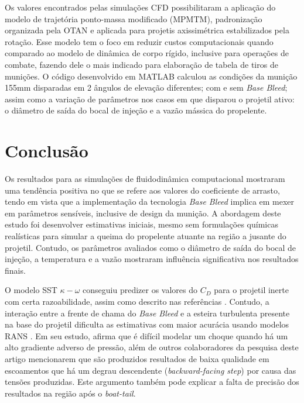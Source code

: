 Os valores encontrados pelas simulações CFD possibilitaram a aplicação do modelo de trajetória ponto-massa modificado (MPMTM), padronização organizada pela OTAN \cite{stanag4355} e aplicada para projetis axissimétrica estabilizados pela rotação. Esse modelo tem o foco em reduzir custos computacionais quando comparado ao modelo de dinâmica de corpo rígido, inclusive para operações de combate, fazendo dele o mais indicado para elaboração de tabela de tiros de munições. O código desenvolvido em MATLAB\textregistered{} calculou as condições da munição 155mm disparadas em 2 ângulos de elevação diferentes; com e sem \textit{Base Bleed}; assim como a variação de parâmetros nos casos em que disparou o projetil ativo: o diâmetro de saída do bocal de injeção e a vazão mássica do propelente. 

\section{Conclusão}

Os resultados para as simulações de fluidodinâmica computacional mostraram uma tendência positiva no que se refere aos valores do coeficiente de arrasto, tendo em vista que a implementação da tecnologia \textit{Base Bleed} implica em mexer em parâmetros sensíveis, inclusive de design da munição. A abordagem deste estudo foi desenvolver estimativas iniciais, mesmo sem formulações químicas realísticas para simular a queima do propelente atuante na região a jusante do projetil. Contudo, os parâmetros avaliados como o diâmetro de saída do bocal de injeção, a temperatura e a vazão mostraram influência significativa nos resultados finais.

O modelo SST $\kappa-\omega$ conseguiu predizer os valores do $C_D$ para o projetil inerte com certa razoabilidade, assim como descrito nas referências \cite{Mahmoud2009,nicolas-perez_accuracy_2017}. Contudo, a interação entre a frente de chama do \textit{Base Bleed} e a esteira turbulenta presente na base do projetil dificulta as estimativas com maior acurácia usando modelos RANS \cite{nicolas-perez_accuracy_2017}. Em seu estudo, \citeauthor{Spalart1992} afirma que é difícil modelar um choque quando há um alto gradiente adverso de pressão, além de outros colaboradores da pesquisa deste artigo mencionarem que são produzidos resultados de baixa qualidade em escoamentos que há um degrau descendente (\textit{backward-facing step}) por causa das tensões produzidas. Este argumento também pode explicar a falta de precisão dos resultados na região após o \textit{boat-tail}.

